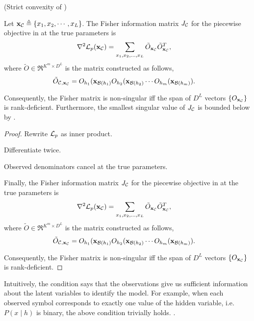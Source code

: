   \begin{lemma} (Strict convexity of )
  \label{lem:hessian}

  Let $\mathbf{x}_{\mathcal{C}} \triangleq\{x_1, x_2, \cdots, x_L\}$. The Fisher information
  matrix $J_{\mathcal{C}}$ for the piecewise objective in  at the
  true parameters is 
  \begin{align}
    \nabla^2 \mathcal{L}_p(\mathbf{x}_{\mathcal{C}}) 
    &= \sum_{x_1, x_2, \ldots, x_L} \tilde O_{\mathbf{x}_{\mathcal{C}}} \tilde O_{\mathbf{x}_{\mathcal{C}}}^T,
  \end{align}
  where $\tilde O \in \Re^{K^m \times D^L}$ is the matrix constructed as follows,
  \begin{align}
    \tilde O_{\mathcal{C}, \mathbf{x}_{\mathcal{C}}} &= O_{h_1}(\mathbf{x}_{\mathcal{B}(h_1)} O_{h_2}(\mathbf{x}_{\mathcal{B}(h_2)} \cdots O_{h_m}(\mathbf{x}_{\mathcal{B}(h_m)}).
  \end{align}

  Consequently, the Fisher matrix is non-singular iff the span of $D^L$ vectors $\{ O_{\mathbf{x}_{\mathcal{C}}} \}$ is rank-deficient.
  Furthermore, the smallest singular value of $J_{\mathcal{C}}$ is bounded below
    by .
\end{lemma}
\begin{proof}
  Rewrite $\mathcal{L}_p$ as inner product.

  Differentiate twice.

  Observed denominators cancel at the true parameters.

  Finally, the Fisher information matrix $J_{\mathcal{C}}$ for the piecewise
  objective in  at the true parameters is 
  \begin{align}
    \nabla^2 \mathcal{L}_p(\mathbf{x}_{\mathcal{C}}) 
    &= \sum_{x_1, x_2, \ldots, x_L} \tilde O_{\mathbf{x}_{\mathcal{C}}} \tilde O_{\mathbf{x}_{\mathcal{C}}}^T,
  \end{align}
  where $\tilde O \in \Re^{K^m \times D^L}$ is the matrix constructed as follows,
  \begin{align}
    \tilde O_{\mathcal{C}, \mathbf{x}_{\mathcal{C}}} &= O_{h_1}(\mathbf{x}_{\mathcal{B}(h_1)} O_{h_2}(\mathbf{x}_{\mathcal{B}(h_2)} \cdots O_{h_m}(\mathbf{x}_{\mathcal{B}(h_m)}).
  \end{align}

  Consequently, the Fisher matrix is non-singular iff the span of $D^L$
    vectors $\{ O_{\mathbf{x}_{\mathcal{C}}} \}$ is rank-deficient.

\end{proof}

Intuitively, the condition  says that the observations give
  us sufficient information about the latent variables to identify the
  model. 
For example, when each observed symbol corresponds to exactly one value
  of the hidden variable, i.e. $P(x \mid h )$ is binary, the above
  condition trivially holds\verify.
.

